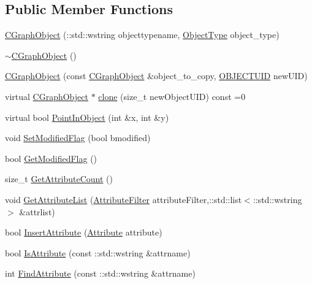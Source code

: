 \subsection*{Public Member Functions}
\begin{DoxyCompactItemize}
\item 
\hyperlink{class_c_graph_object_a8665e459fb29c8537a2e7a98b0ba57ec}{C\+Graph\+Object} (\+::std\+::wstring objecttypename, \hyperlink{_object_database_defines_8h_a842c5e2e69277690b064bf363c017980}{Object\+Type} object\+\_\+type)
\item 
\hyperlink{class_c_graph_object_af2a0b462c2cd7917bb8a11a7e957eea7}{$\sim$\+C\+Graph\+Object} ()
\item 
\hyperlink{class_c_graph_object_ab4415af501a73c42fc1d9967ffe838bd}{C\+Graph\+Object} (const \hyperlink{class_c_graph_object}{C\+Graph\+Object} \&object\+\_\+to\+\_\+copy, \hyperlink{_object_database_defines_8h_a164ec120b01429b93c9cd0bef2a67e64}{O\+B\+J\+E\+C\+T\+U\+I\+D} new\+U\+I\+D)
\item 
virtual \hyperlink{class_c_graph_object}{C\+Graph\+Object} $\ast$ \hyperlink{class_c_graph_object_ad52779c03c6f16f194314642f667b4d5}{clone} (size\+\_\+t new\+Object\+U\+I\+D) const  =0
\item 
virtual bool \hyperlink{class_c_graph_object_a30e3d0d5391f1404f382dcdd501a85c7}{Point\+In\+Object} (int \&x, int \&y)
\item 
void \hyperlink{class_c_graph_object_a582e924439ad6eae2352e71e44a188c9}{Set\+Modified\+Flag} (bool bmodified)
\item 
bool \hyperlink{class_c_graph_object_af21160cb20a4c1bd860e41ccb581834d}{Get\+Modified\+Flag} ()
\item 
size\+\_\+t \hyperlink{class_c_graph_object_a1c53828d07ba5e0671b2c13690b1ca39}{Get\+Attribute\+Count} ()
\item 
void \hyperlink{class_c_graph_object_a0ca2e870485d1c71a876bf6ae86d7a28}{Get\+Attribute\+List} (\hyperlink{_object_database_defines_8h_a9375b9b0a96355d86fa7f021ab5023b9}{Attribute\+Filter} attribute\+Filter,\+::std\+::list$<$\+::std\+::wstring $>$ \&attrlist)
\item 
bool \hyperlink{class_c_graph_object_a1718b5eeb58fff04b5e71e818256bff4}{Insert\+Attribute} (\hyperlink{class_attribute}{Attribute} attribute)
\item 
bool \hyperlink{class_c_graph_object_a46a0d407469ed94dae527212bd225cda}{Is\+Attribute} (const \+::std\+::wstring \&attrname)
\item 
int \hyperlink{class_c_graph_object_ae12c75b2b9233a04e9823b90efea0b51}{Find\+Attribute} (const \+::std\+::wstring \&attrname)

\end{DoxyCompactItemize}
